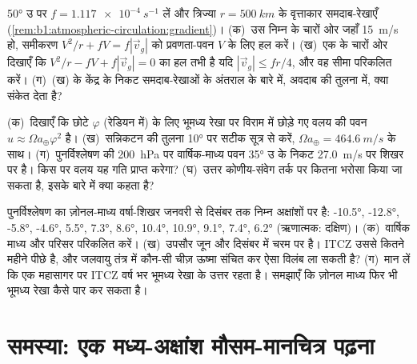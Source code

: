 \begin{exercise}[$\star\star\star$]\label{exo:b1:atmospheric-circulation:10}
\ang{50} उ पर $f = \qty{1.117e-4}{s^{-1}}$ लें और त्रिज्या
$r = \qty{500}{km}$ के वृत्ताकार समदाब-रेखाएँ (\cref{rem:b1:atmospheric-circulation:gradient})। (क)~उस निम्न के चारों ओर जहाँ  \qty{15}{m/s} हो, समीकरण $V^2/r + fV =
f|\vec v_g|$ को प्रवणता-पवन $V$ के लिए हल करें। (ख)~एक  के चारों ओर दिखाएँ कि $V^2/r - fV + f
|\vec v_g| = 0$ का हल तभी है यदि $|\vec v_g| \leq fr/4$, और वह सीमा परिकलित करें। (ग)~(ख)  के केंद्र के निकट समदाब-रेखाओं के अंतराल के बारे में, अवदाब की तुलना में, क्या संकेत देता है?
\end{exercise}

\begin{exercise}[$\star\star\star$]\label{exo:b1:atmospheric-circulation:11}
(क)~दिखाएँ कि छोटे $\varphi$ (रेडियन में) के लिए भूमध्य रेखा पर विराम में छोड़े गए वलय की पवन
$u \approx \Omega a_\oplus\varphi^2$ है। (ख)~सन्निकटन की तुलना \ang{10} पर सटीक सूत्र से करें, $\Omega a_\oplus = \qty{464.6}{m/s}$ के साथ। (ग)~पुनर्विश्लेषण की \qty{200}{hPa} पर वार्षिक-माध्य पवन \ang{35} उ के निकट \qty{27.0}{m/s} पर शिखर पर है। किस  पर वलय यह गति प्राप्त करेगा? (घ)~उत्तर कोणीय-संवेग तर्क पर कितना भरोसा किया जा सकता है, इसके बारे में क्या कहता है?
\end{exercise}

\begin{exercise}[$\star\star\star$]\label{exo:b1:atmospheric-circulation:12}
पुनर्विश्लेषण का ज़ोनल-माध्य वर्षा-शिखर जनवरी से दिसंबर तक निम्न अक्षांशों पर है: \ang{-10.5}, \ang{-12.8}, \ang{-5.8}, \ang{-4.6}, \ang{5.5},
\ang{7.3}, \ang{8.6}, \ang{10.4}, \ang{10.9}, \ang{9.1}, \ang{7.4}, \ang{6.2} (ऋणात्मक: दक्षिण)। (क)~वार्षिक माध्य और परिसर परिकलित करें। (ख)~उपसौर  जून और दिसंबर में चरम पर है। ITCZ उससे कितने महीने पीछे है, और जलवायु तंत्र में कौन-सी चीज़ ऊष्मा संचित कर ऐसा विलंब ला सकती है? (ग)~मान लें कि एक महासागर पर ITCZ वर्ष भर भूमध्य रेखा के उत्तर रहता है। समझाएँ कि ज़ोनल माध्य फिर भी भूमध्य रेखा कैसे पार कर सकता है।
\end{exercise}

\section{समस्या: एक मध्य-अक्षांश मौसम-मानचित्र पढ़ना}


